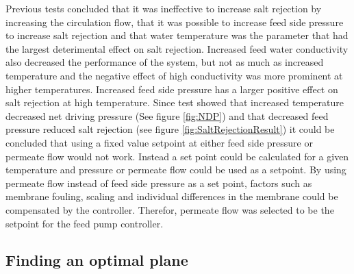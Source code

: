 Previous tests concluded that it was ineffective to increase salt rejection by increasing the circulation flow, that it was possible to increase feed side pressure to increase salt rejection and that water temperature was the parameter that had the largest deterimental effect on salt rejection. Increased feed water conductivity also decreased the performance of the system, but not as much as increased temperature and the negative effect of high conductivity was more prominent at higher temperatures. Increased feed side pressure has a larger positive effect on salt rejection at high temperature.
Since test showed that increased temperature decreased net driving pressure (See figure \ref{fig:NDP}) and that decreased feed pressure reduced salt rejection (see figure \ref{fig:SaltRejectionResult}) it could be concluded that using a fixed value setpoint at either feed side pressure or permeate flow would not work. Instead a set point could be calculated for a given temperature and pressure or permeate flow could be used as a setpoint.
By using permeate flow instead of feed side pressure as a set point, factors such as membrane fouling, scaling and individual differences in the membrane could be compensated by the controller. Therefor, permeate flow was selected to be the setpoint for the feed pump controller. 

\subsection{Finding an optimal plane}


